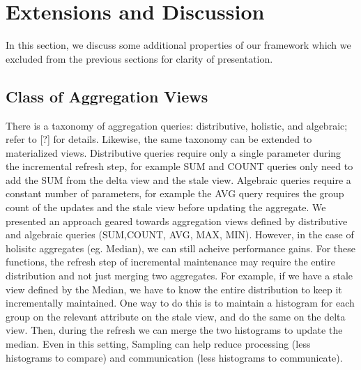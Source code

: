 \section{Extensions and Discussion}
In this section, we discuss some additional properties of our framework which
we excluded from the previous sections for clarity of presentation.

\subsection{Class of Aggregation Views}
There is a taxonomy of aggregation queries: distributive, holistic, and algebraic; refer to [?] for details.
Likewise, the same taxonomy can be extended to materialized views.
Distributive queries require only a single parameter during the incremental refresh step, for example SUM and COUNT queries only need to
add the SUM from the delta view and the stale view.
Algebraic queries require a constant number of parameters, for example the AVG query requires the group count of the updates and the stale view before updating the aggregate.
We presented an approach geared towards aggregation views defined by distributive and algebraic queries (SUM,COUNT, AVG, MAX, MIN).
However, in the case of holisitc aggregates (eg. Median), we can still acheive performance gains.
For these functions, the refresh step of incremental maintenance may require the entire distribution and not just merging two aggregates.
For example, if we have a stale view defined by the Median, we have to know the entire distribution to keep it incrementally maintained.
One way to do this is to maintain a histogram for each group on the relevant attribute on the stale view, and do the same on the delta view.
Then, during the refresh we can merge the two histograms to update the median.
Even in this setting, Sampling can help reduce processing (less histograms to compare) and communication (less histograms to communicate). 

